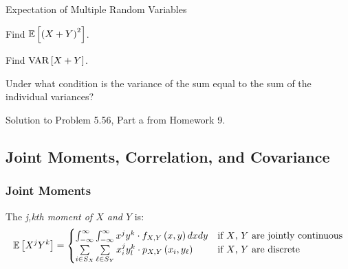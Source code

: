 		\begin{example}[Problem 5.56]{Expectation of Multiple Random Variables}
                  \begin{boldalphlist}
                  \item Find $\operatorname{\operatorname{\mathbb{E}}} \left[ \left( X+Y \right)^{2} \right]$.
                  \item Find $\operatorname{\operatorname{VAR}} \left[ X+Y \right]$.
                  \item Under what condition is the variance of the sum equal to the sum of the individual variances?
                  \end{boldalphlist}

                  \tcblower

                  Solution to Problem 5.56, Part a from Homework 9.
		\end{example}

	\subsection{Joint Moments, Correlation, and Covariance} \label{subsec:Joint Moments, Correlation, and Covariance}
		\subsubsection{Joint Moments} \label{subsubsec:Joint Moments}
			\begin{definition} \label{def:jkth Moment}
				The \emph{j,kth moment of $X$ and $Y$} is:
				\begin{equation} \label{eq:jkth Moment}
					\operatorname{\operatorname{\mathbb{E}}} \left[ X^{j} Y^{k} \right] =
					\begin{cases}
						\int_{-\infty}^{\infty} \int_{-\infty}^{\infty} x^{j} y^{k} \cdot f_{X,Y} \left( x,y \right) dx dy &
							\text{if $X$, $Y$ are jointly continuous} \\
						\sum\limits_{i \in S_{X}} \sum\limits_{\ell \in S_{Y}} x_{i}^{j} y_{l}^{k} \cdot p_{X,Y} \left( x_{i},y_{\ell} \right) & 
							\text{if $X$, $Y$ are discrete} \\
					\end{cases}
				\end{equation}
			\end{definition} 
		
